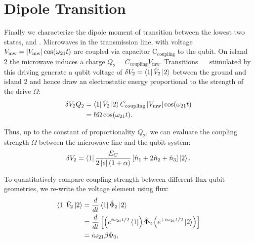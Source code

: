 \section{Dipole Transition}
\label{sec:dipole-transition}

\noindent  Finally we  characterize the  dipole moment  of transition  between the  lowest two
states,     and  .   Microwaves   in  the  transmission  line,   with  voltage
$   V_{\text{mw}}=   \left|V_{\text{mw}}\right|\cos(\omega_{21   }t)   $  are   coupled   via   capacitor
C$_{\text{coupling}}$  to   the  qubit.   On   island  2   the  microwave  induces   a  charge
$ Q_{2}=C_{\text{coupling}}V_{\text{mw}} $.  Transitions ~\ilra~ stimulated by
this driving  generate a qubit voltage  of $ \delta  V_2 = \Bra{1}\hat{V}_2\Ket{2} $  between the
ground and  island 2 and  hence draw an  electrostatic energy proportional  to the strength  of the
drive $\Omega$:
\begin{equation}
  \label{eq:dipoleEnergy}
  \begin{aligned}
    \delta V_{2}Q_{2} & = \Bra{1}\hat{V}_2\Ket{2} C_{\text{coupling}}\left|V_{\text{mw}}\right|\cos(\omega_{21}  t) \\
    & = \hbar\Omega\cos(\omega_{21}t).
  \end{aligned}
\end{equation}

\noindent Thus, up to the constant of proportionality $ Q_{2} $, we can evaluate the coupling strength $\Omega$ between the microwave line and the qubit system:
\begin{equation}
  \label{eq:dv2}
  \delta     V_2     =\Bra{1}\frac{E_{C}}{2\left|e\right|(1+\alpha)}\left[\hat{n}_1     +     2\hat{n}_2     +
    \hat{n}_3\right]\Ket{2}.
\end{equation}

\noindent To
quantitatively compare coupling strength between  different flux qubit geometries, we re-write
the voltage element using flux:
\begin{equation}
  \label{eq:dipole_voltage_7}
  \begin{aligned}
    \Bra{1}\hat{V}_2 \Ket{2} & =  \frac{d}{dt}\Bra{1}\hat{\Phi}_2\Ket{2}\\
    & = \frac{d}{dt}\left[\left(e^{i\omega_{21}t/2}\Bra{1}\right) \hat{\Phi}_2\left(e^{+i\omega_{21}t/2}\Ket{2}\right)\right]\\
    & = {i\omega_{21}\beta\Phi_0},
  \end{aligned}
\end{equation}

